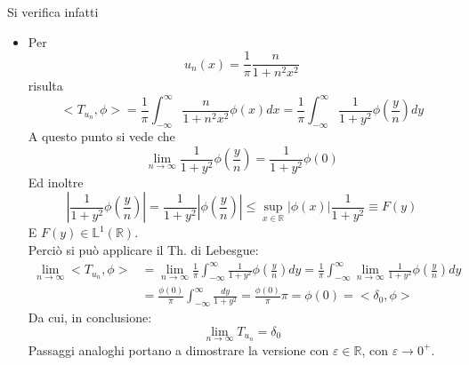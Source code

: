 \documentclass[twoside]{article}
\begin{document}
Si verifica infatti
\begin{itemize}
    \item Per
    \begin{equation}
        u_n(x)=\frac{1}{\pi}\frac{n}{1+n^2x^2}
    \end{equation}
    risulta
    \begin{equation}
        <T_{u_n},\phi>=\frac{1}{\pi}\int_{-\infty}^\infty \frac{n}{1+n^2x^2}\phi(x)dx=\frac{1}{\pi}\int_{-\infty}^\infty \frac{1}{1+y^2}\phi\left(\frac{y}{n}\right)dy
    \end{equation}
    A questo punto si vede che
    \begin{equation*}
        \lim_{n\to \infty}\frac{1}{1+y^2}\phi\left(\frac{y}{n}\right)=\frac{1}{1+y^2}\phi(0) 
    \end{equation*}
    Ed inoltre
    \begin{equation}
        \left| \frac{1}{1+y^2}\phi\left( \frac{y}{n}\right) \right|=\frac{1}{1+y^2}\left| \phi\left(\frac{y}{n} \right) \right|\le \sup_{x\in \mathds{R}}|\phi(x)|\frac{1}{1+y^2}\equiv F(y)
    \end{equation}
    E $F(y)\in \mathds{L}^1(\mathds{R})$.
    \\
    Perciò si può applicare il Th. di Lebesgue:
   \begin{align}
            \lim_{n\to \infty}<T_{u_n},\phi>&=\lim_{n\to \infty}\frac{1}{\pi}\int_{-\infty}^\infty\frac{1}{1+y^2}\phi\left( \frac{y}{n}\right)dy=   \frac{1}{\pi}\int_{-\infty}^\infty \lim_{n\to\infty} \frac{1}{1+y^2}\phi\left(\frac{y}{n}\right)dy\\&=\frac{\phi(0)}{\pi}\int_{-\infty}^\infty \frac{dy}{1+y^2}=\frac{\phi(0)}{\pi}\pi=\phi(0)=<\delta_0,\phi>
    \end{align}
    Da cui, in conclusione:
    \begin{equation}
     \lim_{n\to\infty}T_{u_n}=\delta_0   
    \end{equation}
    Passaggi analoghi portano a dimostrare la versione con $\varepsilon \in \mathds{R}$, con $\varepsilon\to0^+$.
    

\end{itemize}
\end{document}

